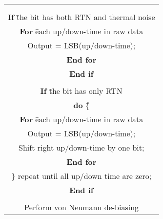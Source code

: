 
\begin{center}

\begin{tabular}{|c|}
\hline
\begin{minipage}[t]{3.2in}



\begin{tabbing}
{\bf Algorithm IV Convert the raw data to binary random sequence. }
\\
\\ {\bf If} \= the bit has both RTN and thermal noise
\\ \> {\bf For} \= each up/down-time in raw data
\\ \>\>   Output = LSB(up/down-time);
\\ \> {\bf End for}
\\ {\bf End if}
\\
\\ {\bf If} \= the bit has only RTN
\\ \> {\bf do} \= \{
\\ \>\> {\bf For} \= each up/down-time in raw data
\\ \>\>\>    Output = LSB(up/down-time);
\\ \>\>\>    Shift right up/down-time by one bit;
\\ \>\> {\bf End for}
\\ \> \} repeat until all up/down time are zero;
\\ {\bf End if}
\\
\\Perform von Neumann de-biasing


\end{tabbing}
\end{minipage}
\\ \hline
\end{tabular}
\end{center}
